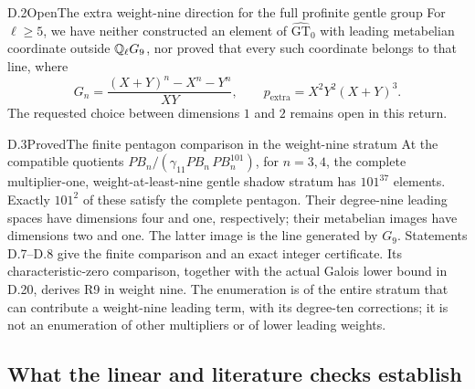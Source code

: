 \begin{statement}{D.2}{Open}{The extra weight-nine direction for the full profinite gentle group}
For $\ell\geq5$, we have neither constructed an element of
$\widehat{\mathrm{GT}}_0$ with leading metabelian coordinate outside
$\mathbb Q_\ell G_9$, nor proved that every such coordinate belongs to that line,
where
\[
 G_n=\frac{(X+Y)^n-X^n-Y^n}{XY},\qquad
 p_{\mathrm{extra}}=X^2Y^2(X+Y)^3.
\]
The requested choice between dimensions $1$ and $2$ remains open in
this return.
\end{statement}

\begin{statement}{D.3}{Proved}{The finite pentagon comparison in the weight-nine stratum}
At the compatible quotients
$PB_n/(\gamma_{11}PB_n\,PB_n^{101})$, for $n=3,4$, the complete
multiplier-one, weight-at-least-nine gentle shadow stratum has
$101^{37}$ elements. Exactly $101^2$ of these satisfy the complete
pentagon. Their degree-nine leading spaces have dimensions four and
one, respectively; their metabelian images have dimensions two and
one. The latter image is the line generated by $G_9$.
Statements D.7--D.8 give the finite comparison and an exact integer
certificate. Its characteristic-zero comparison, together with the
actual Galois lower bound in D.20, derives R9 in weight nine.
The enumeration is of the entire stratum that can contribute a
weight-nine leading term, with its degree-ten corrections; it is
not an enumeration of other multipliers or of lower leading weights.
\end{statement}

\subsection{What the linear and literature checks establish}

